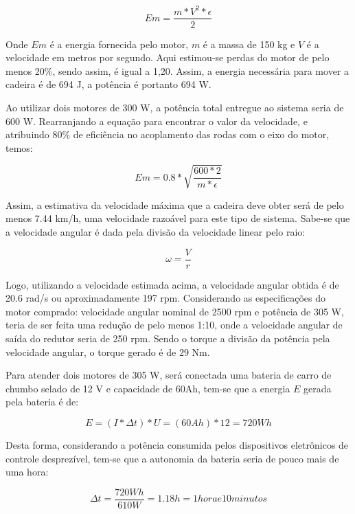 \begin{equation}
Em = \frac{m*V^2*\epsilon}{2}
\end{equation}

Onde $Em$ é a energia fornecida pelo motor, $m$ é a massa de 150 kg e $V$ é a velocidade em metros por segundo. Aqui estimou-se perdas do motor de pelo menos 20\%, sendo assim, é igual a 1,20. Assim, a energia necessária para mover a cadeira é de 694 J, a potência é portanto 694 W.

Ao utilizar dois motores de 300 W, a potência total entregue ao sistema seria de 600 W. Rearranjando a equação para encontrar o valor da velocidade, e atribuindo 80\% de eficiência no acoplamento das rodas com o eixo do motor, temos:

\begin{equation}
Em = 0.8*\sqrt{\frac{600*2}{m*\epsilon}}
\end{equation}

Assim, a estimativa da velocidade máxima que a cadeira deve obter será de pelo menos 7.44 km/h, uma velocidade razoável para este tipo de sistema. Sabe-se que a velocidade angular é dada pela divisão da velocidade linear pelo raio:

\begin{equation}
\omega = \frac{V}{r}
\end{equation}

Logo, utilizando a velocidade estimada acima, a velocidade angular obtida é de 20.6 rad/s ou aproximadamente 197 rpm. Considerando as especificações do motor comprado: velocidade angular nominal de 2500 rpm e potência de 305 W, teria de ser feita uma redução de pelo menos 1:10, onde a velocidade angular de saída do redutor seria de 250 rpm. Sendo o torque a divisão da potência pela velocidade angular, o torque gerado é de 29 Nm.

Para atender dois motores de 305 W, será conectada uma bateria de carro de chumbo selado de 12 V e capacidade de 60Ah, tem-se que a energia $E$ gerada pela bateria é de:

\begin{equation}
E = (I*\Delta t)*U = (60Ah)*12 = 720Wh
\end{equation}

Desta forma, considerando a potência consumida pelos dispositivos eletrônicos de controle desprezível, tem-se que a autonomia da bateria seria de pouco mais de uma hora:

\begin{equation}
\Delta t = \frac{720 Wh}{610 W} = 1.18 h = 1 hora e 10 minutos
\end{equation}

